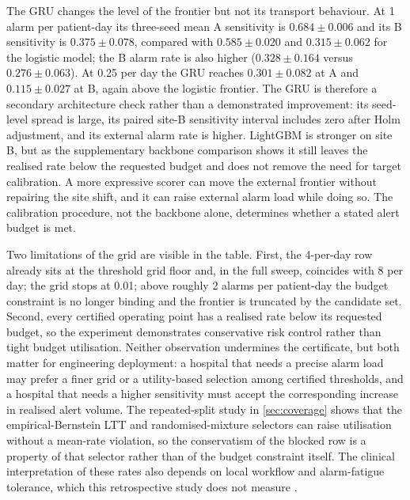 The GRU changes the level of the frontier but not its transport behaviour. At 1 alarm per patient-day its three-seed mean A sensitivity is $0.684\pm0.006$ and its B sensitivity is $0.375\pm0.078$, compared with $0.585\pm0.020$ and $0.315\pm0.062$ for the logistic model; the B alarm rate is also higher ($0.328\pm0.164$ versus $0.276\pm0.063$). At 0.25 per day the GRU reaches $0.301\pm0.082$ at A and $0.115\pm0.027$ at B, again above the logistic frontier. The GRU is therefore a secondary architecture check rather than a demonstrated improvement: its seed-level spread is large, its paired site-B sensitivity interval includes zero after Holm adjustment, and its external alarm rate is higher. LightGBM is stronger on site B, but as the supplementary backbone comparison shows it still leaves the realised rate below the requested budget and does not remove the need for target calibration. A more expressive scorer can move the external frontier without repairing the site shift, and it can raise external alarm load while doing so. The calibration procedure, not the backbone alone, determines whether a stated alert budget is met.

Two limitations of the grid are visible in the table. First, the 4-per-day row already sits at the threshold grid floor and, in the full sweep, coincides with 8 per day; the grid stops at 0.01; above roughly 2 alarms per patient-day the budget constraint is no longer binding and the frontier is truncated by the candidate set. Second, every certified operating point has a realised rate below its requested budget, so the experiment demonstrates conservative risk control rather than tight budget utilisation. Neither observation undermines the certificate, but both matter for engineering deployment: a hospital that needs a precise alarm load may prefer a finer grid or a utility-based selection among certified thresholds, and a hospital that needs a higher sensitivity must accept the corresponding increase in realised alert volume. The repeated-split study in \cref{sec:coverage} shows that the empirical-Bernstein LTT and randomised-mixture selectors can raise utilisation without a mean-rate violation, so the conservatism of the blocked row is a property of that selector rather than of the budget constraint itself. The clinical interpretation of these rates also depends on local workflow and alarm-fatigue tolerance, which this retrospective study does not measure \citep{ray2026alert,jaidev2026sepsis}.
